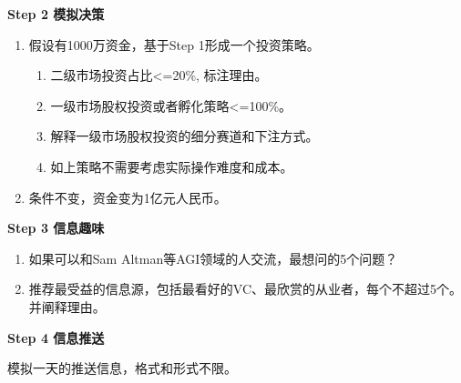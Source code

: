 \documentclass[fontset=overleaf，12pt]{ctexart}
\begin{document}
\textbf{Step 2 模拟决策}
\begin{enumerate}
    \item 假设有1000万资金，基于Step 1形成一个投资策略。
    \begin{enumerate}
        \item  二级市场投资占比<=20\%, 标注理由。
        \item  一级市场股权投资或者孵化策略<=100\%。
        \item  解释一级市场股权投资的细分赛道和下注方式。
        \item 如上策略不需要考虑实际操作难度和成本。
    \end{enumerate}
    \item 条件不变，资金变为1亿元人民币。
\end{enumerate}

\textbf{Step 3 信息趣味}

\begin{enumerate}
    \item  如果可以和Sam Altman等AGI领域的人交流，最想问的5个问题？
    \item 推荐最受益的信息源，包括最看好的VC、最欣赏的从业者，每个不超过5个。并阐释理由。
\end{enumerate}

\textbf{Step 4 信息推送}

模拟一天的推送信息，格式和形式不限。
\newpage

\newpage

\newpage

\newpage

\end{document}
